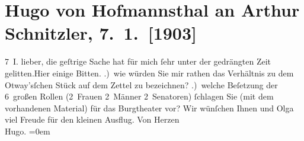 

         
         \renewcommand{\erwaehntePersonen}{Personen: Thomas Otway, Olga Schnitzler}
         \renewcommand{\erwaehnteInstitutionen}{Institutionen: Burgtheater}
         \renewcommand{\erwaehnteOrte}{Orte: Wien}
         \renewcommand{\erwaehnteWerke}{Werke: Das gerettete Venedig}
               \section[Hugo von Hofmannsthal an Arthur Schnitzler, 7. 1. {[}1903{]}]{ Hugo von Hofmannsthal an Arthur Schnitzler, 7. 1. {[}1903{]}}\nopagebreak{}\rehead{ }\begin{ledgroupsized}[t]{13cm}\normalsize\beginnumbering \toendnotes[C]{\smallbreak\pagebreak[2]} 
\toendnotes[C]{\smallbreak}\pstart
           \raggedleft{}{\pb}7 I.\pend
           \pstart
           lieber, die geſtrige Sache hat für mich ſehr unter der gedrängten
               Zeit gelitten.\hspace*{2.5em}Hier einige Bitten.\pend
           .) wie würden Sie mir rathen das Verhältnis zu dem Otway’sſchen{ }Stück auf dem Zettel zu
               bezeichnen? \pend
           .) welche Beſetzung der 6 großen Rollen (2 Frauen 2 Männer {\pb}2 Senatoren) ſchlagen Sie (mit dem
               vorhandenen Material) für das Burgtheater
               vor?\pend
           \pstart
           Wir wünſchen Ihnen und Olga viel Freude für den
               kleinen Ausflug.\pend
           \pstart
           Von Herzen{\\[\baselineskip]}\spacefill\mbox{Hugo.}\pend
           \leftskip=0em{}
         
         \endnumbering{}\end{ledgroupsized}  \newcommand{\dateiname}{L01264}\newcommand{\titel}{Hugo von Hofmannsthal an Arthur Schnitzler, 7. 1. [1903]}\newcommand{\editorInnen}{Martin Anton Müller und Gerd-Hermann Susen}
      